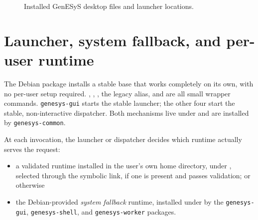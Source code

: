 \begin{figure}[htbp]
    \centering



    \caption{Installed GenESyS desktop files and launcher locations.}
    \label{fig:user-installed-structure}
\end{figure}

\section{Launcher, system fallback, and per-user runtime}
\label{sec:user-installation-launcher-and-runtime-selection}

The Debian package installs a stable base that works completely on its own,
with no per-user setup required. ,
, , the legacy
 alias, and  are all
small wrapper commands. \texttt{genesys-gui} starts the stable launcher;
the other four start the stable, non-interactive dispatcher. Both mechanisms
live under  and are installed by
\texttt{genesys-common}.

At each invocation, the launcher or dispatcher decides which runtime actually
serves the request:
\begin{itemize}
\item a validated runtime installed in the user's own home directory, under
  , selected through the
   symbolic link, if one is present and
  passes validation; or otherwise
\item the Debian-provided \emph{system fallback} runtime, installed under
   by the \texttt{genesys-gui},
  \texttt{genesys-shell}, and \texttt{genesys-worker} packages.
\end{itemize}

